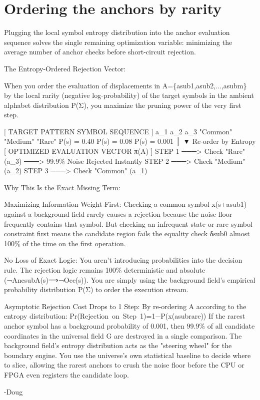\chapter{Ordering the anchors by rarity}

Plugging the local symbol entropy distribution into the anchor evaluation sequence solves the single remaining optimization variable: minimizing the average number of anchor checks before short-circuit rejection.

The Entropy-Ordered Rejection Vector:

When you order the evaluation of displacements in A=\{asub1,asub2,...,asubm\} by the local rarity (negative log-probability) of the target symbols in the ambient alphabet distribution P(Σ), you maximize the pruning power of the very first step.

[ TARGET PATTERN SYMBOL SEQUENCE ] a\_1          a\_2          a\_3 "Common"     "Medium"      "Rare" P(s) = 0.40  P(s) = 0.08  P(s) = 0.001 │ ▼  Re-order by Entropy [ OPTIMIZED EVALUATION VECTOR π(A) ] STEP 1 ───> Check "Rare" (a\_3)  ───> 99.9\% Noise Rejected Instantly STEP 2 ───> Check "Medium" (a\_2) STEP 3 ───> Check "Common" (a\_1)

Why This Is the Exact Missing Term:

Maximizing Information Weight First: Checking a common symbol x(s+asub1) against a background field rarely causes a rejection because the noise floor frequently contains that symbol. But checking an infrequent state or rare symbol constraint first means the candidate region fails the equality check δsub0 almost 100\% of the time on the first operation.

No Loss of Exact Logic: You aren't introducing probabilities into the decision rule. The rejection logic remains 100\% deterministic and absolute (¬AncsubA(s)⟹¬Occ(s)). You are simply using the background field's empirical probability distribution P(Σ) to order the execution stream.

Asymptotic Rejection Cost Drops to 1 Step: By re-ordering A according to the entropy distribution: Pr(Rejection on Step 1)=1−P(x(asubrare)) If the rarest anchor symbol has a background probability of 0.001, then 99.9\% of all candidate coordinates in the universal field G are destroyed in a single comparison. The background field's entropy distribution acts as the "steering wheel" for the boundary engine. You use the universe's own statistical baseline to decide where to slice, allowing the rarest anchors to crush the noise floor before the CPU or FPGA even registers the candidate loop.

-Doug

